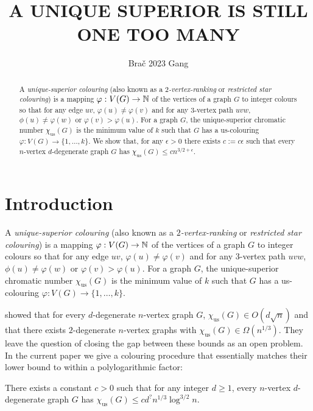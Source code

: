 \documentclass[kpfonts]{patmorin}
\title{\MakeUppercase{A Unique Superior is Still One Too Many}}
\author{Bra\v{c} 2023 Gang}
\newcommand{\defin}[1]{\emph{\color{brightmaroon}#1}}
\newcommand{\trn}{\chi_{\mathrm{us}}}
\begin{document}
\maketitle

\begin{abstract}
  A \defin{unique-superior colouring} (also known as a \defin{$2$-vertex-ranking} or \defin{restricted star colouring}) is a mapping $\varphi:V(G)\to\mathbb{N}$ of the vertices of a graph $G$ to integer colours so that for any edge $uv$, $\varphi(u)\neq \varphi(v)$ and for any $3$-vertex path $uvw$, $\phi(u)\neq\varphi(w)$ or $\varphi(v)>\varphi(u)$.  For a graph $G$, the unique-superior chromatic number $\trn(G)$ is the minimum value of $k$ such that $G$ has a us-colouring $\varphi:V(G)\to\{1,\ldots,k\}$.  We show that, for any $\epsilon >0$ there exists $c:=c\epsilon$ such that every $n$-vertex $d$-degenerate graph $G$ has $\trn(G) \le c n^{3/2+\epsilon}$.
\end{abstract}


%



\section{Introduction}

A \defin{unique-superior colouring} (also known as a \defin{$2$-vertex-ranking} or \defin{restricted star colouring}) is a mapping $\varphi:V(G)\to\mathbb{N}$ of the vertices of a graph $G$ to integer colours so that for any edge $uv$, $\varphi(u)\neq \varphi(v)$ and for any $3$-vertex path $uvw$, $\phi(u)\neq\varphi(w)$ or $\varphi(v)>\varphi(u)$.  For a graph $G$, the unique-superior chromatic number $\trn(G)$ is the minimum value of $k$ such that $G$ has a us-colouring $\varphi:V(G)\to\{1,\ldots,k\}$.

\citet{karpas.neiman.ea:on} showed that for every $d$-degenerate $n$-vertex graph $G$, $\trn(G)\in O(d\sqrt{n})$ and that there exists $2$-degenerate $n$-vertex graphs with $\trn(G)\in\Omega(n^{1/3})$.  They leave the question of closing the gap between these bounds as an open problem. In the current paper we give a colouring procedure that essentially matches their lower bound to within a polylogarithmic factor:

\begin{thm}\label{d_degenerate_upper_bound}
  There exists a constant $c>0$ such that for any integer $d\ge 1$, every $n$-vertex $d$-degenerate graph $G$ has $\trn(G) \le c d^? n^{1/3}\log^{3/2} n$.
\end{thm}
\end{document}
